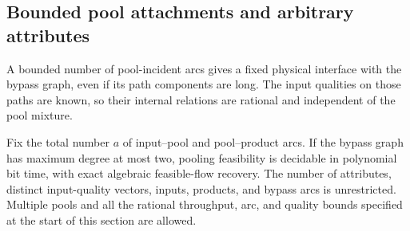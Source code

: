 \subsection{Bounded pool attachments and arbitrary attributes}
\label{s4:attachments}

A bounded number of pool-incident arcs gives a fixed physical interface
with the bypass graph, even if its path components are long. The input
qualities on those paths are known, so their internal relations are
rational and independent of the pool mixture.

\begin{theorem}
\label{s4:bounded-attachments}
Fix the total number $a$ of input--pool and pool--product arcs.
If the bypass graph has maximum degree at most two, pooling feasibility
is decidable in polynomial bit time, with exact algebraic feasible-flow
recovery. The number of attributes, distinct input-quality vectors,
inputs, products, and bypass arcs is unrestricted. Multiple pools and
all the rational throughput, arc, and quality bounds specified at the
start of this section are allowed.
\end{theorem}
